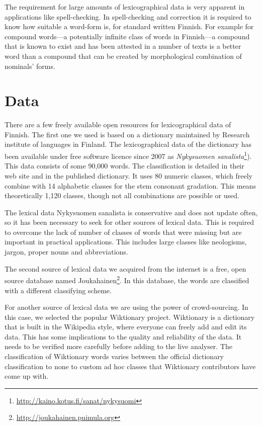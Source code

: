 \documentclass[a4paper,12pt]{article}
\begin{document}
The requirement for large amounts of lexicographical data is very apparent in
applications like spell-checking. In spell-checking and correction it is
required to know how suitable a word-form is, for standard written Finnish.
For example for compound words---a potentially infinite class of words in
Finnish---a compound that is known to exist and has been attested in a number
of texts is a better word than a compound that can be created by morphological
combination of nominals' forms.

\section{Data}
\label{sec:data}

There are a few freely available open resources for lexicographical data of
Finnish. The first one  we used is based on a dictionary maintained by Research
institute of languages in Finland. The lexicographical data of the dictionary
has been available under free software licence since 2007 as \emph{Nykysuomen
sanalista}\footnote{\url{http://kaino.kotus.fi/sanat/nykysuomi}}).  This data
consists of some 90,000 words.  The classification is detailed in their web
site and in the published dictionary.  It uses 80 numeric classes, which freely
combine with 14 alphabetic classes for the stem consonant gradation.  This
means theoretically 1,120 classes, though not all combinations are possible or
used. 

The lexical data Nykysuomen sanalista is conservative and does not
update often, so it has been necessary to seek for other sources of lexical
data. This is required to overcome the lack of number of classes of words that
were missing but are important in practical applications. This includes large
classes like neologisms, jargon, proper nouns and abbreviations.

The second source of lexical data we acquired from the internet is a free, open
source database named
Joukahainen\footnote{\url{http://joukahainen.puimula.org}}. In this database,
the words are classified with a different classifying scheme.

For another source of lexical data we are using the power of crowd-sourcing. In
this case, we selected the popular Wiktionary project.  Wiktionary is a
dictionary that is built in the Wikipedia style, where everyone can freely add
and edit its data. This has some implications to the quality and reliability of
the data. It needs to be verified more carefully before adding to the live
analyser. The classification of Wiktionary words varies between the official
dictionary classification to none to custom ad hoc classes that Wiktionary
contributors have come up with.
\end{document}
